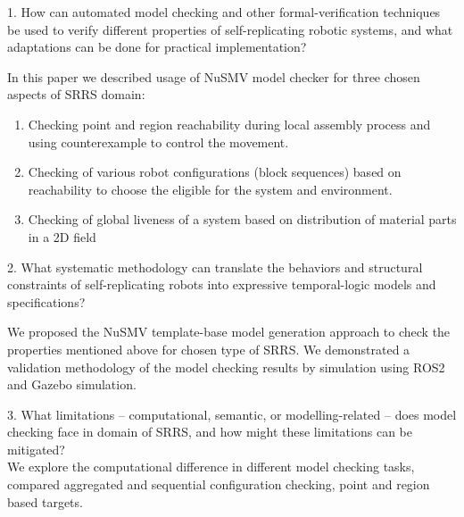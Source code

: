 
    1. How can automated model checking and other formal-verification 
        techniques be used to verify different properties of 
        self-replicating robotic systems, and what adaptations 
        can be done for practical implementation?

        In this paper we described usage of NuSMV model checker for 
        three chosen aspects of SRRS domain:
\begin{enumerate}
    
    \item Checking point and region reachability during local assembly process 
        and using counterexample to control the movement.

    \item Checking of various robot configurations (block sequences) based on reachability
    to choose the eligible for the system and environment.

    \item Checking of global liveness of a system based on distribution of material parts
    in a 2D field
\end{enumerate}

    2. What systematic methodology can translate the behaviors and 
        structural constraints of self-replicating robots into expressive 
        temporal-logic models and specifications?

    We proposed the NuSMV template-base model generation approach to check the 
    properties mentioned above for chosen type of SRRS. 
    We demonstrated a validation methodology of the model checking results by
    simulation using ROS2 and Gazebo simulation.
    

    3. What limitations -- computational, semantic, or 
        modelling-related -- does model checking face in domain of SRRS,
        and how might these limitations can be mitigated?\\

    We explore the computational difference in different model checking tasks,
    compared aggregated  and sequential configuration checking, point and region based 
    targets.


